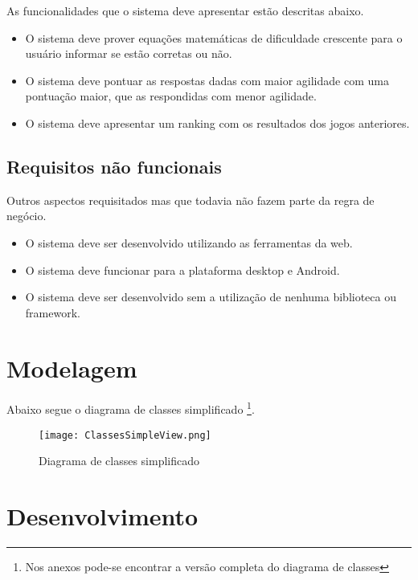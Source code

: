 As funcionalidades que o sistema deve apresentar estão descritas abaixo.

\begin{itemize}
    \item O sistema deve prover equações matemáticas de dificuldade crescente para o usuário informar se estão corretas ou não.
    \item O sistema deve pontuar as respostas dadas com maior agilidade com uma pontuação maior, que as respondidas com menor agilidade.
    \item O sistema deve apresentar um ranking com os resultados dos  jogos anteriores.
\end{itemize}

\subsection{Requisitos não funcionais}

Outros aspectos requisitados mas que todavia não fazem parte da regra de negócio.

\begin{itemize}
    \item O sistema deve ser desenvolvido utilizando as ferramentas da web.
    \item O sistema deve funcionar para a plataforma desktop e Android.
    \item O sistema deve ser desenvolvido sem a utilização de nenhuma biblioteca ou framework.
\end{itemize}

\section{Modelagem}

Abaixo segue o diagrama de classes simplificado \footnote{Nos anexos pode-se encontrar a versão completa do diagrama de classes}.

\begin{figure}
    \centering
    \texttt{[image: ClassesSimpleView.png]}
	\caption{Diagrama de classes simplificado}
    \label{fig:simpleDiagram}
\end{figure}

\section{Desenvolvimento}

